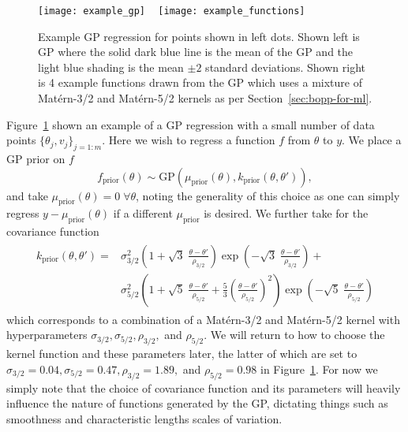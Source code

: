\begin{figure}[t]
	\texttt{[image: example\_gp]}
		~
	\texttt{[image: example\_functions]}
	\caption{Example GP regression for points shown in left dots.  Shown left is GP where
		the solid dark blue line is the mean of the GP and the light blue shading is the
		mean $\pm2$ standard deviations.  Shown right is 4 example functions drawn
		from the GP which uses a mixture of Mat\'{e}rn-3/2 and Mat\'{e}rn-5/2 kernels
		as per Section~\ref{sec:bopp-for-ml}.\label{fig:opt:example_gp}}
\end{figure}

Figure~\ref{fig:opt:example_gp} shown an example of a GP regression with a small
number of data points $\{\theta_j,{v}_j\}_{j=1:m}$.  Here we wish to regress a function $f$ 
from $\theta$ to $y$.  We place a GP prior on $f$
\[
f_{\mathrm{prior}} (\theta) \sim \mathrm{GP}\left(\mu_{\text{prior}} (\theta),k_{\text{prior}}(\theta,\theta')\right),
\]
and take $\mu_{\text{prior}} (\theta) = 0 \; \forall \theta$, noting the
generality of this choice as one can simply regress $y-\mu_{\text{prior}}(\theta)$ if
a different $\mu_{\text{prior}}$ is desired.  We further take for the covariance function
\begin{align}
\label{eq:opt:kprior}
\begin{split}
k_{\text{prior}}\left(\theta,\theta'\right) = & \sigma_{3/2}^2 \left(1+\sqrt{3} \; \frac{\theta-\theta'}{\rho_{3/2}}\right)\exp\left(-\sqrt{3} \;\frac{\theta-\theta'}{\rho_{3/2}}\right) +\\&\sigma_{5/2}^2 \left(1+\sqrt{5}\;\frac{\theta-\theta'}{\rho_{5/2}}+\frac{5}{3}\left(\frac{\theta-\theta'}{\rho_{5/2}}\right)^2\right)\exp\left(-\sqrt{5}\;\frac{\theta-\theta'}{\rho_{5/2}}\right)
\end{split}
\end{align}
which corresponds to a combination of a Mat\'{e}rn-3/2 and Mat\'{e}rn-5/2
kernel with hyperparameters $\sigma_{3/2}, \sigma_{5/2}, \rho_{3/2},$ and
$\rho_{5/2}$.  We will return to how to choose the kernel function and
these parameters later, the latter of which are set to
$\sigma_{3/2}=0.04, \sigma_{5/2}=0.47, \rho_{3/2}=1.89,$ and
$\rho_{5/2}=0.98$ in Figure~\ref{fig:opt:example_gp}.  For now we simply note
that the choice of covariance function and its parameters will heavily influence 
the nature of functions generated by the GP, dictating things such as smoothness 
and characteristic lengths scales of variation.


